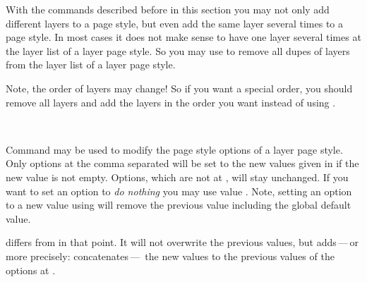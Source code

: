 \begin{Declaration}
\end{Declaration}
%
With the commands described before in this section you may not only add
different layers to a page style, but even add the same layer several times to
a page style. In most cases it does not make sense to have one layer several
times at the layer list of a layer page style. So you may use
 to remove all dupes of layers from the layer
list of a layer page style. 

Note, the order of layers may change! So if
you want a special order, you should remove all layers and add the layers in
the order you want instead of using .%

\begin{Declaration}
  \\
\end{Declaration}
%
%
Command  may be used to modify the page
style options of a layer page style. Only options at the comma separated
 will be set to the new values given in 
if the new value is not empty. Options, which are not at ,
will stay unchanged. If you want to set an option to \emph{do nothing} you may
use value . Note, setting an option to a new value using
 will remove the previous value including
the global default value.

 differs from
 in that point. It will not overwrite the
previous values, but adds\,---\,or more precisely: concatenates\,---\, the new
values to the previous values of the options at .%
%
%

